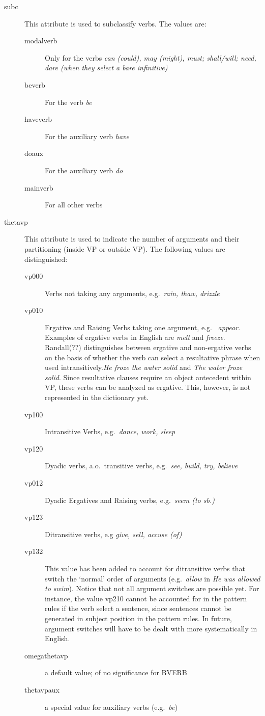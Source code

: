 \begin{description}
\item[subc] This attribute is used to subclassify verbs. The values are:
  \begin{description}
  \item[modalverb] Only for the verbs {\em can (could), may (might), must; 
shall/will;    need, dare (when they select a bare infinitive)\/}
  \item[beverb] For the verb {\em be\/}
  \item[haveverb] For the auxiliary verb {\em have\/}
  \item[doaux] For the auxiliary verb {\em do\/}
  \item[mainverb] For all other verbs
\end{description}

\item[thetavp] This attribute is used to indicate the number of arguments and their 
partitioning (inside VP or outside VP). The following values are distinguished:
  \begin{description}
  \item[vp000] Verbs not taking any arguments, e.g.\ {\em rain, thaw, drizzle\/}
  \item[vp010] Ergative and Raising Verbs taking one argument, e.g.\ {\em  
    appear\/}. Examples of ergative verbs in English are {\em melt} and {
\em freeze}. Randall(??) distinguishes between ergative and non-ergative 
verbs on the basis of
whether the verb can select a resultative phrase when used 
intransitively.{\em He froze the water solid} and {\em 
The water froze solid}. Since resultative clauses require an object antecedent 
within VP, these verbs can be analyzed as ergative. This, however, is not 
represented in the dictionary yet.
  \item[vp100] Intransitive Verbs, e.g.\ {\em  dance, work, sleep\/}
  \item[vp120] Dyadic verbs, a.o.\ transitive verbs, e.g.\ {\em see, build,
             try, believe\/}
  \item[vp012] Dyadic Ergatives and Raising verbs, e.g.\ {\em seem (to sb.)}
  \item[vp123] Ditransitive verbs, e.g {\em give, sell, accuse (of)\/}
  \item[vp132] This value has been added to account for ditransitive verbs 
      that switch the `normal' order of arguments (e.g.\ {\em allow\/} in {\em
      He was allowed to swim\/}). Notice that not all argument switches are 
possible yet. For instance, the value vp210 cannot be accounted for in the 
pattern rules if the verb select a sentence, since sentences cannot be 
generated in subject position in the pattern rules. In future, 
argument switches will have to be dealt with more systematically in English.
  \item[omegathetavp] a default value; of no significance for BVERB
  \item[thetavpaux] a special value for auxiliary verbs (e.g.\ {\em be\/})
  \end{description}


\end{description}
